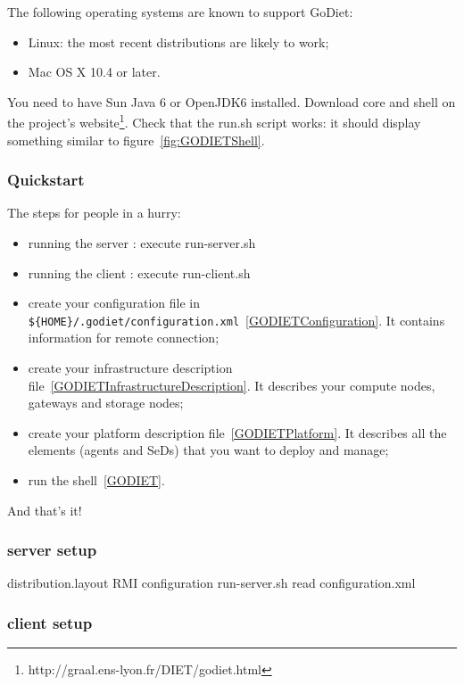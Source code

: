 The following operating systems are known to support GoDiet:
\begin{itemize}
    \item Linux: the most recent distributions are likely to work;
    \item Mac OS X 10.4 or later.
\end{itemize}

You need to have Sun Java 6 or OpenJDK6 installed.
Download \godiet core and shell on the project's website\footnote{http://graal.ens-lyon.fr/DIET/godiet.html}.
Check that the run.sh script works: it should display something similar to figure~\ref{fig:GODIETShell}.


\subsubsection{Quickstart}
\bla The steps for people in a hurry:
\begin{itemize}
\bla \item running the server : execute run-server.sh
\bla \item running the client : execute run-client.sh
\item create your \godiet configuration file in \verb+${HOME}/.godiet/configuration.xml+~\ref{GODIETConfiguration}. It contains information for remote connection;
\item create your infrastructure description file~\ref{GODIETInfrastructureDescription}. It describes your compute nodes, gateways and storage nodes;
\item create your \diet platform description file~\ref{GODIETPlatform}. It describes all the \diet elements (agents and SeDs) that you want to deploy and manage;
\item run the \godiet shell~\ref{GODIET}.
\end{itemize}
And that's it!


\bla \subsubsection{\godiet server setup}

distribution.layout
RMI configuration
run-server.sh read configuration.xml\label{GODIETConfiguration}


\bla \subsubsection{\godiet client setup}

